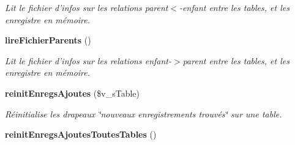 \begin{CompactItemize}
\begin{CompactList}\small\item\em Lit le fichier d'infos sur les relations parent$<$-enfant entre les tables, et les enregistre en mémoire. \item\end{CompactList}\item 
{\bf lireFichierParents} ()\label{class_c_export_db_100151376c1594e7c303671ca80668d5}

\begin{CompactList}\small\item\em Lit le fichier d'infos sur les relations enfant-$>$parent entre les tables, et les enregistre en mémoire. \item\end{CompactList}\item 
{\bf reinitEnregsAjoutes} (\$v\_\-sTable)
\begin{CompactList}\small\item\em Réinitialise les drapeaux \char`\"{}nouveaux enregistrements trouvés\char`\"{} sur une table. \item\end{CompactList}\item 
{\bf reinitEnregsAjoutesToutesTables} ()\label{class_c_export_db_95b4cbfbf0d9926da6d550e9d7b774ef}


\end{CompactItemize}
